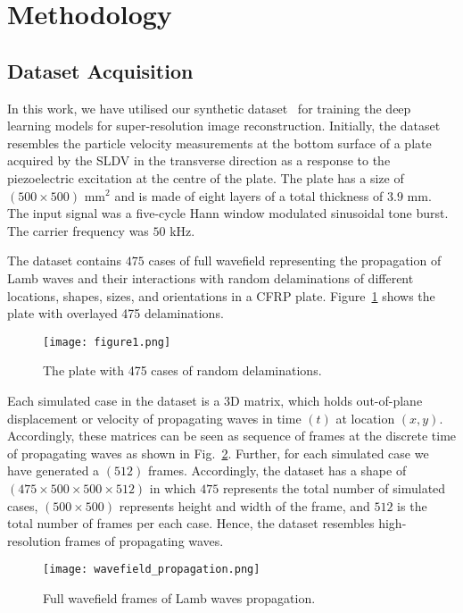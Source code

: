 \section{Methodology}
\subsection{Dataset Acquisition}
In this work, we have utilised our synthetic  dataset~\cite{kudela_pawel_2021_5414555} for training the deep learning models for super-resolution image reconstruction.  
Initially, the dataset resembles the particle velocity measurements at the bottom surface of a plate acquired by the SLDV in the transverse direction as a response to the piezoelectric excitation at the centre of the plate.
The plate has a size of \( (500\times500)\) mm\(^2\) and is made of eight layers of a total thickness of \(3.9\) mm.
The input signal was a five-cycle Hann window modulated sinusoidal tone burst. The carrier frequency was \(50\) kHz.

The dataset contains \(475\) cases of full wavefield representing the propagation of Lamb waves and their interactions with random delaminations of different locations, shapes, sizes, and orientations in a CFRP plate.
Figure~\ref{fig:All_cases} shows the plate with overlayed 475 delaminations.
\begin{figure} [!ht]
	\begin{center}
		\texttt{[image: figure1.png]}
	\end{center}
	\caption{The plate with 475 cases of random delaminations.} 
	\label{fig:All_cases}
\end{figure}

Each simulated case in the dataset is a 3D matrix, which holds out-of-plane displacement or velocity of propagating waves in time \((t)\) at location \((x,y)\). 
Accordingly, these matrices can be seen as sequence of frames at the discrete time of propagating waves as shown in Fig.~\ref{fig:wavefield_propagation}. 
Further, for each simulated case we have generated a \((512)\) frames.
Accordingly, the dataset has a shape of \((475\times500\times500\times512)\) in which \(475\) represents the total number of simulated cases, \((500\times500)\) represents height and width of the frame, and \(512\) is the total number of frames per each case.
Hence, the dataset resembles high-resolution frames of propagating waves.
\begin{figure}[!ht]
	\begin{center}
		\texttt{[image: wavefield\_propagation.png]}
	\end{center}
	\caption{Full wavefield frames of Lamb waves propagation.} 
	\label{fig:wavefield_propagation}
\end{figure}

